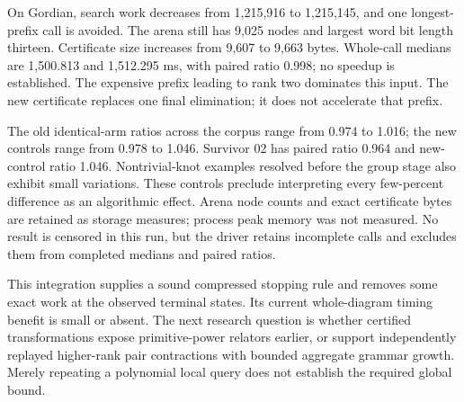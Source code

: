 On Gordian, search work decreases from 1,215,916 to 1,215,145, and one
longest-prefix call is avoided. The arena still has 9,025 nodes and
largest word bit length thirteen. Certificate size increases from 9,607
to 9,663 bytes. Whole-call medians are 1,500.813 and 1,512.295 ms, with
paired ratio 0.998; no speedup is established. The expensive prefix
leading to rank two dominates this input. The new certificate replaces
one final elimination; it does not accelerate that prefix.

The old identical-arm ratios across the corpus range from 0.974 to 1.016;
the new controls range from 0.978 to 1.046. Survivor 02 has paired ratio
0.964 and new-control ratio 1.046. Nontrivial-knot examples resolved before
the group stage also exhibit small variations. These controls preclude
interpreting every few-percent difference as an algorithmic effect.
Arena node counts and exact certificate bytes are retained as storage
measures; process peak memory was not measured. No result is censored in
this run, but the driver retains incomplete calls and excludes them from
completed medians and paired ratios.

This integration supplies a sound compressed stopping rule and removes
some exact work at the observed terminal states. Its current whole-diagram
timing benefit is small or absent. The next research question is whether
certified transformations expose primitive-power relators earlier, or
support independently replayed higher-rank pair contractions with bounded
aggregate grammar growth. Merely repeating a polynomial local query does
not establish the required global bound.
